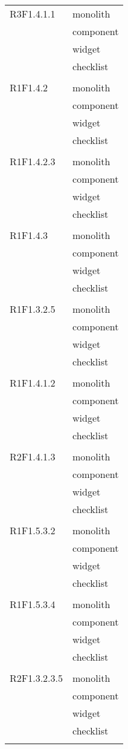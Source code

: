 \begin{center}
\begin{longtable}{|p{7cm}|p{5cm}|}
		R3F1.4.1.1 & monolith \\ & component \\ & widget \\ & checklist \\ & \\ \hline
		R1F1.4.2 & monolith \\ & component \\ & widget \\ & checklist \\ & \\ \hline
		R1F1.4.2.3 & monolith \\ & component \\ & widget \\ & checklist \\ & \\ \hline
		R1F1.4.3 & monolith \\ & component \\ & widget \\ & checklist \\ & \\ \hline
		R1F1.3.2.5 & monolith \\ & component \\ & widget \\ & checklist \\ & \\ \hline
		R1F1.4.1.2 & monolith \\ & component \\ & widget \\ & checklist \\ & \\ \hline
		R2F1.4.1.3 & monolith \\ & component \\ & widget \\ & checklist \\ & \\ \hline
		R1F1.5.3.2 & monolith \\ & component \\ & widget \\ & checklist \\ & \\ \hline
		R1F1.5.3.4 & monolith \\ & component \\ & widget \\ & checklist \\ & \\ \hline
		R2F1.3.2.3.5 & monolith \\ & component \\ & widget \\ & checklist \\ & \\ \hline

\end{longtable}
\end{center}
